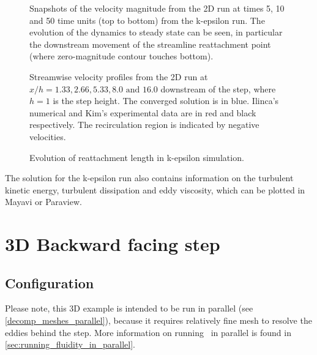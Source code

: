 \begin{figure}
\centering
{}
\caption{Snapshots of the velocity magnitude from the 2D run at times 5, 10 and 50 time units
(top to bottom) from the k-epsilon run.
The evolution of the dynamics to steady state can be seen, in particular the downstream movement
of the streamline reattachment point (where zero-magnitude contour touches bottom).}
\label{Fig:velo-magnitude-2d}
\end{figure}

\begin{figure}
\centering
{}
\caption{Streamwise velocity profiles from the 2D run at $x/h=1.33, 2.66, 5.33, 8.0 \text{ and } 16.0$
downstream of the step, where $h=1$ is the step height. The converged solution is in blue.
Ilinca's numerical and Kim's experimental data \citep{ilinca_97} are in red and black respectively.
The recirculation region is indicated by negative velocities.}
\label{Fig:UProfiles2d}
\end{figure}

\begin{figure}
\centering
{}
\caption{Evolution of reattachment length in k-epsilon simulation.}
\label{Fig:RL2d}
\end{figure}

The solution for the k-epsilon run also contains information on the turbulent kinetic energy, turbulent dissipation and eddy viscosity, which can be plotted in Mayavi or Paraview.


\section{3D Backward facing step}
\label{sec:backward_facing_step_3d}

\subsection{Configuration}
Please note, this 3D example is intended to be run in parallel (see \ref{decomp_meshes_parallel}),
because it requires relatively fine mesh to resolve the eddies behind the step.
More information on running \fluidity\ in parallel is found in \ref{sec:running_fluidity_in_parallel}.


